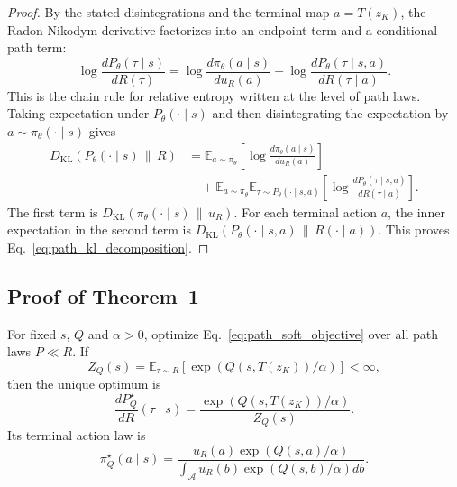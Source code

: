 \documentclass[11pt]{article}
\begin{document}
\begin{proof}
By the stated disintegrations and the terminal map $a=T(z_K)$, the Radon-Nikodym derivative factorizes into an endpoint term and a conditional path term:
\begin{equation}
  \log
  \frac{
    dP_\theta(\tau\mid s)
  }{
    dR(\tau)
  }
  =
  \log
  \frac{
    d\pi_\theta(a\mid s)
  }{
    du_R(a)
  }
  +
  \log
  \frac{
    dP_\theta(\tau\mid s,a)
  }{
    dR(\tau\mid a)
  }.
\end{equation}
This is the chain rule for relative entropy written at the level of path laws. Taking expectation under $P_\theta(\cdot\mid s)$ and then disintegrating the expectation by $a\sim\pi_\theta(\cdot\mid s)$ gives
\begin{align}
  D_{\mathrm{KL}}
  \left(
    P_\theta(\cdot\mid s)
    \,\|\,R
  \right)
  &=
  \mathbb E_{a\sim\pi_\theta}
  \left[
    \log
    \frac{
      d\pi_\theta(a\mid s)
    }{
      du_R(a)
    }
  \right]
  \nonumber\\
  &\quad+
  \mathbb E_{a\sim\pi_\theta}
  \mathbb E_{\tau\sim P_\theta(\cdot\mid s,a)}
  \left[
    \log
    \frac{
      dP_\theta(\tau\mid s,a)
    }{
      dR(\tau\mid a)
    }
  \right].
\end{align}
The first term is $D_{\mathrm{KL}}(\pi_\theta(\cdot\mid s)\,\|\,u_R)$. For each terminal action $a$, the inner expectation in the second term is $D_{\mathrm{KL}}(P_\theta(\cdot\mid s,a)\,\|\,R(\cdot\mid a))$. This proves Eq.~\eqref{eq:path_kl_decomposition}.
\end{proof}

\subsection{Proof of Theorem~1}
\label{app:proof_unrestricted_bridge}

\begin{restatement}
For fixed $s$, $Q$ and $\alpha>0$, optimize Eq.~\eqref{eq:path_soft_objective} over all path laws $P\ll R$. If
\[
  Z_Q(s)
  =
  \mathbb E_{\tau\sim R}
  \left[
    \exp
    \left(
      Q(s,T(z_K))/\alpha
    \right)
  \right]
  <
  \infty,
\]
then the unique optimum is
\[
  \frac{dP_Q^\star}{dR}(\tau\mid s)
  =
  \frac{
    \exp
    \left(
      Q(s,T(z_K))/\alpha
    \right)
  }{
    Z_Q(s)
  }.
\]
Its terminal action law is
\[
  \pi_Q^\star(a\mid s)
  =
  \frac{
    u_R(a)
    \exp
    \left(
      Q(s,a)/\alpha
    \right)
  }{
    \int_{\mathcal A}
    u_R(b)
    \exp
    \left(
      Q(s,b)/\alpha
    \right)
    db
  }.
\]

\end{restatement}
\end{document}
